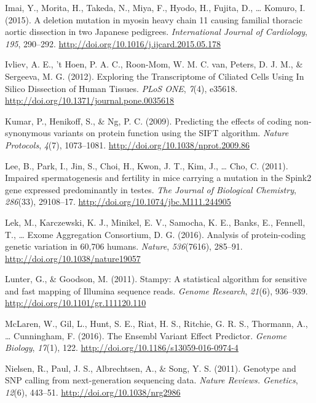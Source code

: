 \documentclass[12pt,twoside]{reedthesis}
\theoremstyle{definition}
\theoremstyle{definition}
\theoremstyle{remark}
\begin{document}
  \hypertarget{ref-Imai2015}{}
  Imai, Y., Morita, H., Takeda, N., Miya, F., Hyodo, H., Fujita, D.,
  \ldots{} Komuro, I. (2015). A deletion mutation in myosin heavy chain 11
  causing familial thoracic aortic dissection in two Japanese pedigrees.
  \emph{International Journal of Cardiology}, \emph{195}, 290--292.
  \url{http://doi.org/10.1016/j.ijcard.2015.05.178}
  
  \hypertarget{ref-Ivliev2012}{}
  Ivliev, A. E., 't Hoen, P. A. C., Roon-Mom, W. M. C. van, Peters, D. J.
  M., \& Sergeeva, M. G. (2012). Exploring the Transcriptome of Ciliated
  Cells Using In Silico Dissection of Human Tissues. \emph{PLoS ONE},
  \emph{7}(4), e35618. \url{http://doi.org/10.1371/journal.pone.0035618}
  
  \hypertarget{ref-Kumar2009}{}
  Kumar, P., Henikoff, S., \& Ng, P. C. (2009). Predicting the effects of
  coding non-synonymous variants on protein function using the SIFT
  algorithm. \emph{Nature Protocols}, \emph{4}(7), 1073--1081.
  \url{http://doi.org/10.1038/nprot.2009.86}
  
  \hypertarget{ref-Lee2011}{}
  Lee, B., Park, I., Jin, S., Choi, H., Kwon, J. T., Kim, J., \ldots{}
  Cho, C. (2011). Impaired spermatogenesis and fertility in mice carrying
  a mutation in the Spink2 gene expressed predominantly in testes.
  \emph{The Journal of Biological Chemistry}, \emph{286}(33), 29108--17.
  \url{http://doi.org/10.1074/jbc.M111.244905}
  
  \hypertarget{ref-Lek2016}{}
  Lek, M., Karczewski, K. J., Minikel, E. V., Samocha, K. E., Banks, E.,
  Fennell, T., \ldots{} Exome Aggregation Consortium, D. G. (2016).
  Analysis of protein-coding genetic variation in 60,706 humans.
  \emph{Nature}, \emph{536}(7616), 285--91.
  \url{http://doi.org/10.1038/nature19057}
  
  \hypertarget{ref-Lunter2011}{}
  Lunter, G., \& Goodson, M. (2011). Stampy: A statistical algorithm for
  sensitive and fast mapping of Illumina sequence reads. \emph{Genome
  Research}, \emph{21}(6), 936--939.
  \url{http://doi.org/10.1101/gr.111120.110}
  
  \hypertarget{ref-McLaren2016}{}
  McLaren, W., Gil, L., Hunt, S. E., Riat, H. S., Ritchie, G. R. S.,
  Thormann, A., \ldots{} Cunningham, F. (2016). The Ensembl Variant Effect
  Predictor. \emph{Genome Biology}, \emph{17}(1), 122.
  \url{http://doi.org/10.1186/s13059-016-0974-4}
  
  \hypertarget{ref-Nielsen2011}{}
  Nielsen, R., Paul, J. S., Albrechtsen, A., \& Song, Y. S. (2011).
  Genotype and SNP calling from next-generation sequencing data.
  \emph{Nature Reviews. Genetics}, \emph{12}(6), 443--51.
  \url{http://doi.org/10.1038/nrg2986}
  
\end{document}
